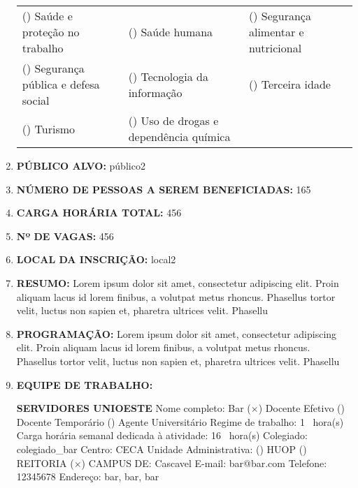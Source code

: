 \documentclass[12pt,a4paper,oneside]{article}%
\begin{document}
\begin{enumerate}
{\begin{tabularx}{\linewidth}{X|X|X}
() Saúde e proteção no trabalho&() Saúde humana&() Segurança alimentar e nutricional\\%
() Segurança pública e defesa social&() Tecnologia da informação&() Terceira idade\\%
() Turismo&() Uso de drogas e dependência química&\\%
\end{tabularx}%
}%
\item%
\textbf{PÚBLICO ALVO: }%
público2%
\item%
\textbf{NÚMERO DE PESSOAS A SEREM BENEFICIADAS: }%
165%
\item%
\textbf{CARGA HORÁRIA TOTAL: }%
456%
\item%
\textbf{Nº DE VAGAS: }%
456%
\item%
\textbf{LOCAL DA INSCRIÇÃO: }%
local2%
\item%
\textbf{RESUMO: }%
\newline%
Lorem ipsum dolor sit amet, consectetur adipiscing elit. Proin aliquam lacus id lorem finibus, a volutpat metus rhoncus. Phasellus tortor velit, luctus non sapien et, pharetra ultrices velit. Phasellu%
\item%
\textbf{PROGRAMAÇÃO: }%
Lorem ipsum dolor sit amet, consectetur adipiscing elit. Proin aliquam lacus id lorem finibus, a volutpat metus rhoncus. Phasellus tortor velit, luctus non sapien et, pharetra ultrices velit. Phasellu%
\item%
\textbf{EQUIPE DE TRABALHO: }%
\newline%
\begin{mdframed}[innertopmargin=5pt, innerleftmargin=3pt, innerrightmargin=3pt]%
\textbf{SERVIDORES UNIOESTE }%
\newline%
Nome completo: %
Bar%
\newline%
 ($\times$) Docente Efetivo %
 () Docente Temporário %
 () Agente Universitário %
\newline%
Regime de trabalho: %
1%
\ hora(s) \hfill%
Carga horária semanal dedicada à atividade: %
16%
\ hora(s) \hfill%
\newline%
Colegiado: %
colegiado\_bar%
\hfill%
Centro: %
CECA%
\newline%
Unidade Administrativa: %
() HUOP %
() REITORIA %
($\times$) CAMPUS DE: %
Cascavel%
\newline%
E-mail: %
bar@bar.com%
\newline%
Telefone: %
12345678%
\newline%
Endereço: %
bar, bar, bar%
\newline%
\begin{mdframed}[innertopmargin=5pt, innerleftmargin=3pt, innerrightmargin=3pt]%

\end{mdframed}
\end{mdframed}
\end{enumerate}
\end{document}
